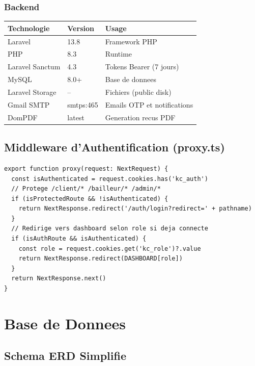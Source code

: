 \documentclass[12pt,a4paper]{article}
\begin{document}
\subsubsection{Backend}

\begin{longtable}{|p{4cm}|p{4cm}|p{5cm}|}
\hline
\textbf{Technologie} & \textbf{Version} & \textbf{Usage} \\
\hline
\endhead
Laravel & 13.8 & Framework PHP \\
\hline
PHP & 8.3 & Runtime \\
\hline
Laravel Sanctum & 4.3 & Tokens Bearer (7 jours) \\
\hline
MySQL & 8.0+ & Base de donnees \\
\hline
Laravel Storage & -- & Fichiers (public disk) \\
\hline
Gmail SMTP & smtps:465 & Emails OTP et notifications \\
\hline
DomPDF & latest & Generation recus PDF \\
\hline
\end{longtable}

\subsection{Middleware d'Authentification (proxy.ts)}

\begin{lstlisting}[caption=Convention Next.js 16 -- proxy.ts]
export function proxy(request: NextRequest) {
  const isAuthenticated = request.cookies.has('kc_auth')
  // Protege /client/* /bailleur/* /admin/*
  if (isProtectedRoute && !isAuthenticated) {
    return NextResponse.redirect('/auth/login?redirect=' + pathname)
  }
  // Redirige vers dashboard selon role si deja connecte
  if (isAuthRoute && isAuthenticated) {
    const role = request.cookies.get('kc_role')?.value
    return NextResponse.redirect(DASHBOARD[role])
  }
  return NextResponse.next()
}
\end{lstlisting}

\section{Base de Donnees}

\subsection{Schema ERD Simplifie}
\end{document}
